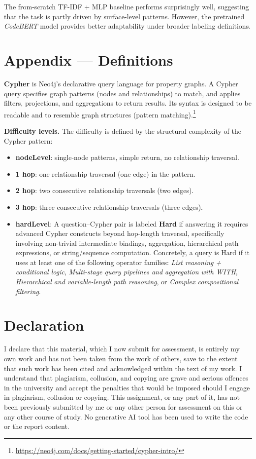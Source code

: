 \documentclass{article}
\begin{document}
The from-scratch TF-IDF + MLP baseline performs surprisingly well, suggesting that the task is partly driven by surface-level patterns. However, the pretrained \textit{CodeBERT} model provides better adaptability under broader labeling definitions.


\section{Appendix — Definitions}

\textbf{Cypher} is Neo4j’s declarative query language for property graphs. A Cypher query specifies graph patterns (nodes and relationships) to match, and applies filters, projections, and aggregations to return results. Its syntax is designed to be readable and to resemble graph structures (pattern matching).\footnote{\url{https://neo4j.com/docs/getting-started/cypher-intro/}}

\textbf{Difficulty levels.} The difficulty is defined by the structural complexity of the Cypher pattern:
\begin{itemize}
\item \textbf{nodeLevel}: single-node patterns, simple return, no relationship traversal.
\item \textbf{1 hop}: one relationship traversal (one edge) in the pattern.
\item \textbf{2 hop}: two consecutive relationship traversals (two edges).
\item \textbf{3 hop}: three consecutive relationship traversals (three edges).
\item \textbf{hardLevel}: A question--Cypher pair is labeled \textbf{Hard} if answering it requires advanced Cypher constructs beyond hop-length traversal, specifically involving non-trivial intermediate bindings, aggregation, hierarchical path expressions, or string/sequence computation. Concretely, a query is Hard if it uses at least one of the following operator families: \emph{List reasoning + conditional logic}, \emph{Multi-stage query pipelines and aggregation with WITH}, \emph{Hierarchical and variable-length path reasoning}, or \emph{Complex compositional filtering}.
\end{itemize}

\section{Declaration}

I declare that this material, which I now submit for assessment, is entirely my own work and has not been taken from the work of others, save to the extent that such work has been cited and acknowledged within the text of my work. I understand that plagiarism, collusion, and copying are grave and serious offences in the university and accept the penalties that would be imposed should I engage in plagiarism, collusion or copying. This assignment, or any part of it, has not been previously submitted by me or any other person for assessment on this or any other course of study. No generative AI tool has been used to write the code or the report content.
\end{document}
